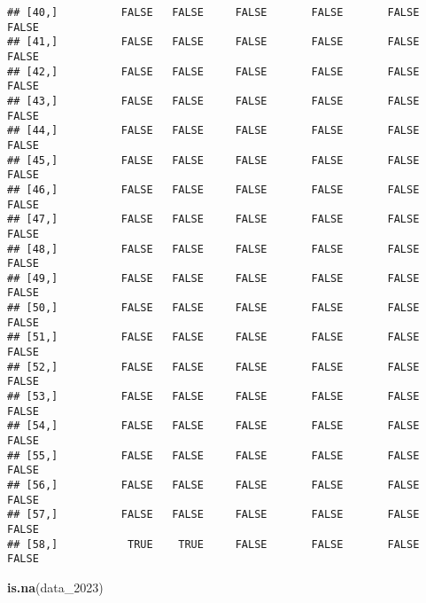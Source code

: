 \documentclass[
]{article}
\newenvironment{Shaded}{\begin{snugshade}}{\end{snugshade}}
\newcommand{\FunctionTok}[1]{\textcolor[rgb]{0.13,0.29,0.53}{\textbf{#1}}}
\newcommand{\NormalTok}[1]{#1}
\begin{document}
\begin{verbatim}
## [40,]          FALSE   FALSE     FALSE       FALSE       FALSE FALSE
## [41,]          FALSE   FALSE     FALSE       FALSE       FALSE FALSE
## [42,]          FALSE   FALSE     FALSE       FALSE       FALSE FALSE
## [43,]          FALSE   FALSE     FALSE       FALSE       FALSE FALSE
## [44,]          FALSE   FALSE     FALSE       FALSE       FALSE FALSE
## [45,]          FALSE   FALSE     FALSE       FALSE       FALSE FALSE
## [46,]          FALSE   FALSE     FALSE       FALSE       FALSE FALSE
## [47,]          FALSE   FALSE     FALSE       FALSE       FALSE FALSE
## [48,]          FALSE   FALSE     FALSE       FALSE       FALSE FALSE
## [49,]          FALSE   FALSE     FALSE       FALSE       FALSE FALSE
## [50,]          FALSE   FALSE     FALSE       FALSE       FALSE FALSE
## [51,]          FALSE   FALSE     FALSE       FALSE       FALSE FALSE
## [52,]          FALSE   FALSE     FALSE       FALSE       FALSE FALSE
## [53,]          FALSE   FALSE     FALSE       FALSE       FALSE FALSE
## [54,]          FALSE   FALSE     FALSE       FALSE       FALSE FALSE
## [55,]          FALSE   FALSE     FALSE       FALSE       FALSE FALSE
## [56,]          FALSE   FALSE     FALSE       FALSE       FALSE FALSE
## [57,]          FALSE   FALSE     FALSE       FALSE       FALSE FALSE
## [58,]           TRUE    TRUE     FALSE       FALSE       FALSE FALSE
\end{verbatim}

\begin{Shaded}
\begin{Highlighting}[]
\FunctionTok{is.na}\NormalTok{(data\_2023)}
\end{Highlighting}
\end{Shaded}
\end{document}
